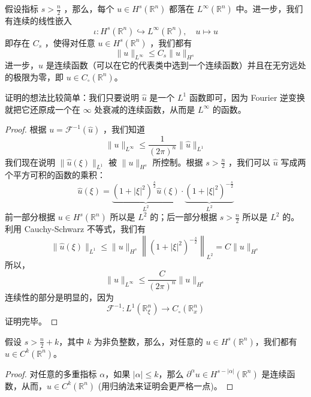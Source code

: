 \begin{theorem}
假设指标 $s>\frac{n}{2}$ ，那么，每个 $u \in H^s\left(\mathbb{R}^n\right)$ 都落在 $L^{\infty}\left(\mathbb{R}^n\right)$ 中。进一步，我们有连续的线性嵌入
\[
\iota: H^s\left(\mathbb{R}^n\right) \hookrightarrow L^{\infty}\left(\mathbb{R}^n\right), \quad u \mapsto u
\]即存在 $C_s$ ，使得对任意 $u \in H^s\left(\mathbb{R}^n\right)$ ，我们都有
\[
\|u\|_{L^{\infty}} \leqslant C_s\|u\|_{H^s}
\]进一步，$u$ 是连续函数（可以在它的代表类中选到一个连续函数）并且在无穷远处的极限为零，即 $u \in C_{\circ}\left(\mathbb{R}^n\right)$。
\end{theorem}
\begin{remark}
证明的想法比较简单：我们只要说明 $\widehat{u}$ 是一个 $L^1$ 函数即可，因为 Fourier 逆变换就把它还原成一个在 $\infty$ 处衰减的连续函数，从而是 $L^{\infty}$ 的函数。
\end{remark}
\begin{proof}
根据 $u=\mathcal{F}^{-1}(\widehat{u})$ ，我们知道
\[
\|u\|_{L^{\infty}} \leqslant \frac{1}{(2 \pi)^n}\|\widehat{u}\|_{L^1}
\]
我们现在说明 $\|\widehat{u}(\xi)\|_{L^1}$ 被 $\|u\|_{H^s}$ 所控制。根据 $s>\frac{n}{2}$ ，我们可以 $\widehat{u}$ 写成两个平方可积的函数的乘积：
\[
\widehat{u}(\xi)=\underbrace{\left(1+|\xi|^2\right)^{\frac{s}{2}} \widehat{u}(\xi)}_{L^2} \cdot \underbrace{\left(1+|\xi|^2\right)^{-\frac{s}{2}}}_{L^2}
\]
前一部分根据 $u \in H^s\left(\mathbb{R}^n\right)$ 所以是 $L^2$ 的；后一部分根据 $s>\frac{n}{2}$ 所以是 $L^2$ 的。利用 Cauchy-Schwarz 不等式，我们有
\[
\|\widehat{u}(\xi)\|_{L^1} \leqslant\|u\|_{H^s}\left\|\left(1+|\xi|^2\right)^{-\frac{s}{2}}\right\|_{L^2}=C\|u\|_{H^s}
\]
所以，
\[
\|u\|_{L^{\infty}} \leqslant \frac{C}{(2 \pi)^n}\|u\|_{H^s}
\]
连续性的部分是明显的，因为
\[
\mathcal{F}^{-1}: L^1\left(\mathbb{R}_{\xi}^n\right) \longrightarrow C_{\circ}\left(\mathbb{R}_x^n\right)
\]
证明完毕。
\end{proof}

\begin{corollary}
假设 $s>\frac{n}{2}+k$，其中 $k$ 为非负整数，那么，对任意的 $u \in H^s\left(\mathbb{R}^n\right)$，我们都有 $u \in C^k\left(\mathbb{R}^n\right)$。
\end{corollary}
\begin{proof}
对任意的多重指标 $\alpha$，如果 $|\alpha| \leqslant k$，那么 $\partial^\alpha u \in H^{s-|\alpha|}\left(\mathbb{R}^n\right)$ 是连续函数，从而，$u \in C^k\left(\mathbb{R}^n\right)$ (用归纳法来证明会更严格一点)。
\end{proof}


